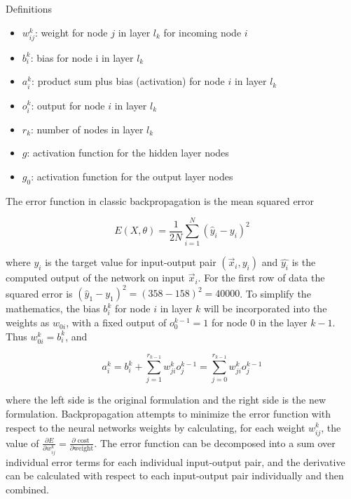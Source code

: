 \documentclass[main.tex]{subfiles}
\begin{document}
\begin{enumerate}
\begin{enumerate}
        Definitions
        
        \begin{itemize}[label={}]
            \item $w_{ij}^k$: weight for node $j$ in layer $l_k$ for incoming node $i$
            \item $b_{i}^{k}$: bias for node i in layer $l_k$
            \item $a_{i}^{k}$: product sum plus bias (activation) for node $i$ in layer $l_k$
            \item $o_{i}^{k}$: output for node $i$ in layer $l_k$
            \item $r_k$: number of nodes in layer $l_k$
            \item $g$: activation function for the hidden layer nodes
            \item $g_0$: activation function for the output layer nodes
        \end{itemize}
        
        The error function in classic backpropagation is the mean squared error 
        
        \begin{equation} \label{meanSquaredError}
        E(X, \theta)=\frac{1}{2 N} \sum_{i=1}^{N}\left(\hat{y}_{i}-y_{i}\right)^{2}
        \end{equation}
        
        where $y_i$ is the target value for input-output pair $\left(\vec{x}_{i}, y_{i}\right)$ and $\hat{y_i}$ is the computed output of the network on input $\vec{x}_i$. For the first row of data the squared error is $\left(\hat{y}_{1}-y_{1}\right)^{2}=\left (358-158\right)^2=40000$. To simplify the mathematics, the bias $b_i^k$ for node $i$ in layer $k$ will be incorporated into the weights as $w_{0i}$, with a fixed output of $o_0^{k-1} = 1$ for node $0$ in the layer $k-1$. Thus $w_{0i}^k = b_i^k$, and 
        
        \begin{equation} \label{productSumBias}
        a_{i}^{k}=b_{i}^{k}+\sum_{j=1}^{r_{k-1}} w_{j i}^{k} o_{j}^{k-1}=\sum_{j=0}^{r_{k-1}} w_{j i}^{k} o_{j}^{k-1}
        \end{equation}
        
        where the left side is the original formulation and the right side is the new formulation. Backpropagation attempts to minimize the error function with respect to the neural networks weights by calculating, for each weight $w_{ij}^{k}$, the value of $\frac{\partial E}{\partial w_{i j}^{k}} = \frac{\partial \text { cost }}{\partial \text{weight}}$. The error function can be decomposed into a sum over individual error terms for each individual input-output pair, and the derivative can be calculated with respect to each  input-output pair individually and then combined.
        

\end{enumerate}
\end{enumerate}
\end{document}
